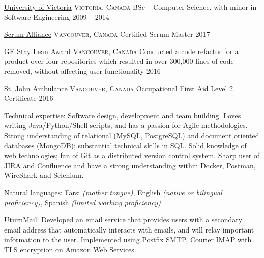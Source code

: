 \documentclass[10pt,a4paper]{article}
\begin{document}
\spacedhrule{-0.2em}{-0.4em}


\headedsection
  {\href{https://www.uvic.ca/}{University of Victoria}}
  {\textsc{Victoria, Canada}} {
  \headedsubsection
    {BSc -- Computer Science, with minor in Software Engineering}
    {2009 -- 2014}
    {}
}

\spacedhrule{0.5em}{-0.4em}

\headedsection
  {\href{https://www.scrumalliance.org/}{Scrum Alliance}}
  {\textsc{Vancouver, Canada}} {
  \headedsubsection
    {Certified Scrum Master}
    {2017}
    {}
}

\headedsection
  {\href{https://www.ge.com}{GE Stay Lean Award}}
  {\textsc{Vancouver, Canada}} {
  \headedsubsection
    {Conducted a code refactor for a product over four repositories which resulted in over 300,000 lines of code removed, without affecting user functionality }
    {2016}
    {}
}

\headedsection
  {\href{https://www.sja.ca}{St. John Ambulance}}
  {\textsc{Vancouver, Canada}} {
  \headedsubsection
    {{Occupational First Aid Level 2 Certificate}}
    {2016}
    {}
}

\spacedhrule{0.5em}{-0.4em}

\inlineheadsection  %
  {Technical expertise:}
  {Software design, development and team building. Loves writing 
Java/\nsp Python/\nsp Shell scripts, and has a passion for Agile methodologies. Strong understanding of relational
(MySQL, PostgreSQL) and document oriented databases (MongoDB); substantial technical skills in SQL. Solid knowledge of web technologies; fan of Git as a distributed version control system. Sharp user of JIRA and Confluence and have a strong understanding within Docker, Postman, WireShark and Selenium.}

\vspace{0.5em}
\inlineheadsection
  {Natural languages:}
  {Farsi \emph{(mother tongue)}, English \emph{(native or bilingual proficiency)},
Spanish \emph{(limited working proficiency)}}

\spacedhrule{1.6em}{-0.4em}

\inlineheadsection
  {UturnMail:}
  {Developed an email service that provides users with a secondary
email address that automatically interacts with emails, and will relay important information to the user.
Implemented using Postfix SMTP, Courier IMAP with TLS encryption on Amazon Web Services.}
\end{document}
